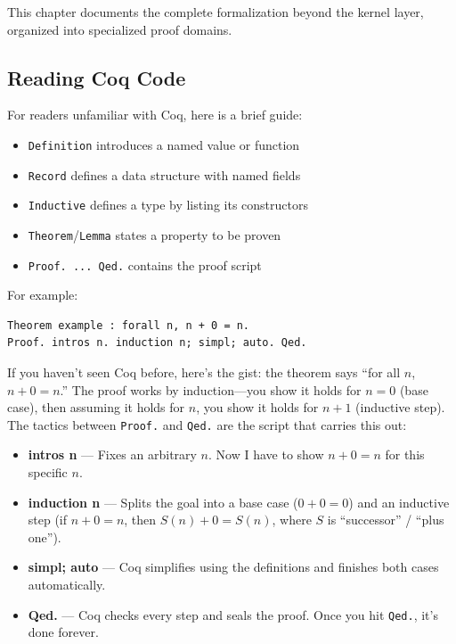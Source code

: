 This chapter documents the complete formalization beyond the kernel layer, organized into specialized proof domains.

\subsection{Reading Coq Code}

For readers unfamiliar with Coq, here is a brief guide:
\begin{itemize}
    \item \texttt{Definition} introduces a named value or function
    \item \texttt{Record} defines a data structure with named fields
    \item \texttt{Inductive} defines a type by listing its constructors
    \item \texttt{Theorem}/\texttt{Lemma} states a property to be proven
    \item \texttt{Proof. ... Qed.} contains the proof script
\end{itemize}

For example:
\begin{lstlisting}
Theorem example : forall n, n + 0 = n.
Proof. intros n. induction n; simpl; auto. Qed.
\end{lstlisting}

If you haven't seen Coq before, here's the gist: the theorem says ``for all $n$, $n + 0 = n$.'' The proof works by induction---you show it holds for $n = 0$ (base case), then assuming it holds for $n$, you show it holds for $n + 1$ (inductive step). The tactics between \texttt{Proof.} and \texttt{Qed.} are the script that carries this out:

\begin{itemize}
    \item \textbf{intros n} — Fixes an arbitrary $n$. Now I have to show $n + 0 = n$ for this specific $n$.
    \item \textbf{induction n} — Splits the goal into a base case ($0 + 0 = 0$) and an inductive step (if $n + 0 = n$, then $S(n) + 0 = S(n)$, where $S$ is ``successor'' / ``plus one'').
    \item \textbf{simpl; auto} — Coq simplifies using the definitions and finishes both cases automatically.
    \item \textbf{Qed.} — Coq checks every step and seals the proof. Once you hit \texttt{Qed.}, it's done forever.
\end{itemize}


